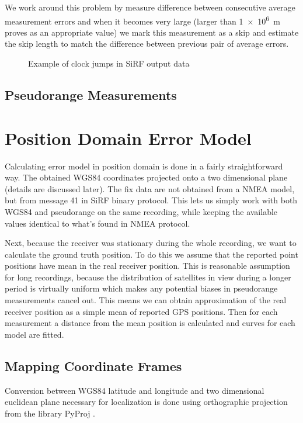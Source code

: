 We work around this problem by measure difference between consecutive average
measurement errors and when it becomes very large (larger than \SI{1e6}{\meter} proves as an
appropriate value) we mark this measurement as a skip and estimate the skip
length to match the difference between previous pair of average errors.

\begin{figure}[tp]
	\centering
	\caption{Example of clock jumps in SiRF output data}
	\label{fig:impl-clock-jumps}
\end{figure}

\subsection{Pseudorange Measurements}

\section{Position Domain Error Model}
Calculating error model in position domain is done in a fairly straightforward way.
The obtained WGS84 coordinates projected onto a two dimensional plane
(details are discussed later).
The fix data are not obtained from a NMEA model, but from message 41 in SiRF
binary protocol.
This lets us simply work with both WGS84 and pseudorange on the same recording,
while keeping the available values identical to what's found in NMEA protocol.

Next, because the receiver was stationary during the whole recording, we want to
calculate the ground truth position.
To do this we assume that the reported point positions have mean in the real receiver position.
This is reasonable assumption for long recordings,
because the distribution of satellites in view during a longer period is
virtually uniform which makes any potential biases in pseudorange measurements
cancel out.
This means we can obtain approximation of the real receiver position as a simple
mean of reported GPS positions.
Then for each measurement a distance from the mean position is calculated and
curves for each model are fitted.

\subsection{Mapping Coordinate Frames}
\label{sec:impl-coordinates}
Conversion between WGS84 latitude and longitude and two dimensional euclidean
plane necessary for localization is done using orthographic projection from
the library PyProj \cite{www-pyproj}.

